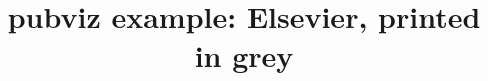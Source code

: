\documentclass[5p]{elsarticle}
\begin{document}
\begin{frontmatter}
\title{pubviz example: Elsevier, printed in grey}
\end{frontmatter}

\end{document}
